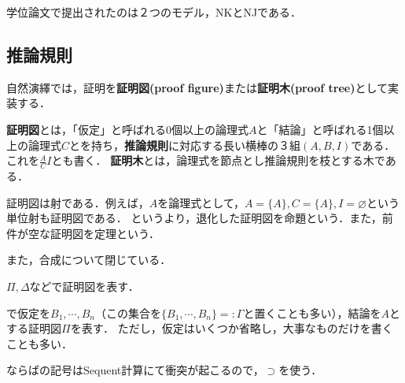 \documentclass[uplatex, dvipdfmx]{jsreport}
\begin{document}
学位論文で提出されたのは２つのモデル，NKとNJである．

\subsection{推論規則}
自然演繹では，証明を\textbf{証明図(proof figure)}または\textbf{証明木(proof tree)}として実装する．

\begin{definition}
    \textbf{証明図}とは，「仮定」と呼ばれる0個以上の論理式$A$と「結論」と呼ばれる1個以上の論理式$C$とを持ち，\textbf{推論規則}に対応する長い横棒の３組$(A,B,I)$である．
    これを$\frac{A}{C}I$とも書く．
    \textbf{証明木}とは，論理式を節点とし推論規則を枝とする木である．
\end{definition}
\begin{remark}
    証明図は射である．例えば，$A$を論理式として，$A=\{A\},C=\{A\},I=\varnothing$という単位射も証明図である．
    というより，退化した証明図を命題という．また，前件が空な証明図を定理という．

    また，合成について閉じている．
\end{remark}

\begin{notation}[証明図]
    $\Pi,\Delta$などで証明図を表す．
    \begin{center}
    \end{center}
    で仮定を$B_1,\cdots,B_n$（この集合を$\{B_1,\cdots,B_n\}=:\Gamma$と置くことも多い），結論を$A$とする証明図$\Pi$を表す．
    ただし，仮定はいくつか省略し，大事なものだけを書くことも多い．
\end{notation}
\begin{notation}[ならば]
    ならばの記号はSequent計算にて衝突が起こるので，$\supset$を使う．
\end{notation}
\end{document}
